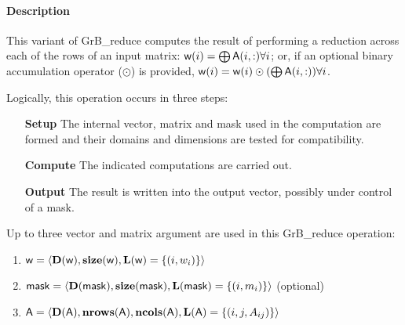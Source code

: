 \paragraph{Description}

This variant of {\sf GrB\_reduce} computes the result of performing
a reduction across each of the rows of an input matrix:
${\sf w}(i) = \bigoplus {\sf A}(i,:) \forall i$; 
or, if an optional binary accumulation 
operator ($\odot$) is provided, ${\sf w}(i) = {\sf w}(i) \odot (\bigoplus {\sf A}(i,:)) \forall i$.  

Logically, this operation occurs in three steps:
\begin{enumerate}[leftmargin=0.75in]
\item[\bf Setup] The internal vector, matrix and mask used in the computation are formed 
and their domains and dimensions are tested for compatibility.
\item[\bf Compute] The indicated computations are carried out.
\item[\bf Output] The result is written into the output vector, possibly under 
control of a mask.
\end{enumerate}

Up to three vector and matrix argument are used in this {\sf GrB\_reduce} operation:
\begin{enumerate}
	\item ${\sf w} = \langle \bold{D}({\sf w}),\bold{size}({\sf w}),
    \bold{L}({\sf w}) = \{(i,w_i) \} \rangle$

	\item ${\sf mask} = \langle \bold{D}({\sf mask}),\bold{size}({\sf mask}),
    \bold{L}({\sf mask}) = \{(i,m_i) \} \rangle$ (optional)

	\item ${\sf A} = \langle \bold{D}({\sf A}),\bold{nrows}({\sf A}),
    \bold{ncols}({\sf A}),\bold{L}({\sf A}) = \{(i,j,A_{ij}) \} \rangle$
\end{enumerate}

